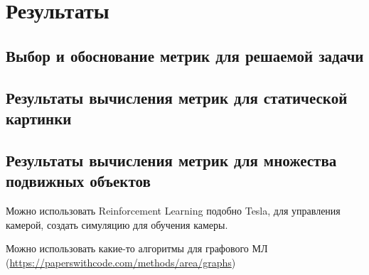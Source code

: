  \chapter{Результаты}

 
\section{Выбор и обоснование метрик для решаемой задачи }

\section{Результаты вычисления метрик для статической картинки }

\section{Результаты вычисления метрик для множества подвижных объектов }

Можно использовать Reinforcement Learning подобно Tesla, для управления камерой, создать симуляцию для обучения камеры.

Можно использовать какие-то алгоритмы для графового МЛ (\url{https://paperswithcode.com/methods/area/graphs})

